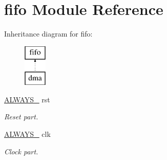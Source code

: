 \hypertarget{enumfifo}{}\section{fifo Module Reference}
\label{enumfifo}
Inheritance diagram for fifo\+:\begin{figure}[H]
\begin{center}
\leavevmode
\includegraphics[height=2.000000cm]{d0/dcc/enumfifo}
\end{center}
\end{figure}
\begin{DoxyCompactItemize}
\item 
\mbox{\hyperlink{enumfifo_aa8122a479ce4de857afe9320219cfa5a}{A\+L\+W\+A\+Y\+S\+\_}} rst
\begin{DoxyCompactList}\small\item\em Reset part. \end{DoxyCompactList}\item 
\mbox{\hyperlink{enumfifo_a45eb09cdeb334de587d997e4c9f2d6db}{A\+L\+W\+A\+Y\+S\+\_}} clk
\begin{DoxyCompactList}\small\item\em Clock part. \end{DoxyCompactList}\end{DoxyCompactItemize}
